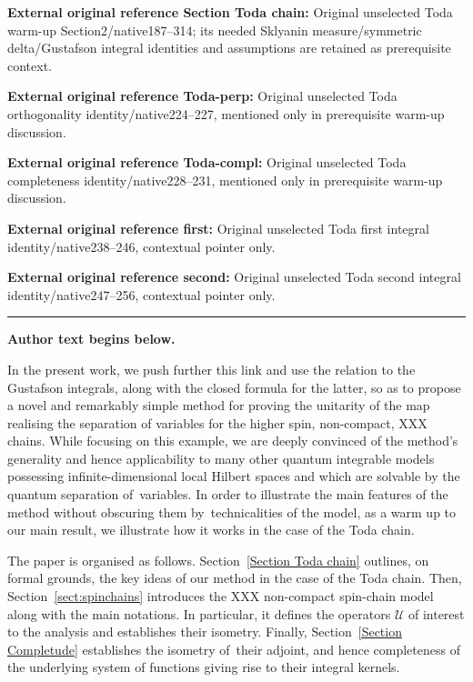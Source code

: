 \documentclass[11pt]{article}
\numberwithin{equation}{section}
\numberwithin{equation}{section}
\begin{document}
\noindent\textbf{External original reference Section Toda chain:} Original unselected Toda warm-up Section2/native187–314; its needed Sklyanin measure/symmetric delta/Gustafson integral identities and assumptions are retained as prerequisite context.\par
\noindent\textbf{External original reference Toda-perp:} Original unselected Toda orthogonality identity/native224–227, mentioned only in prerequisite warm-up discussion.\par
\noindent\textbf{External original reference Toda-compl:} Original unselected Toda completeness identity/native228–231, mentioned only in prerequisite warm-up discussion.\par
\noindent\textbf{External original reference first:} Original unselected Toda first integral identity/native238–246, contextual pointer only.\par
\noindent\textbf{External original reference second:} Original unselected Toda second integral identity/native247–256, contextual pointer only.\par
\medskip\hrule\medskip\noindent\textbf{Author text begins below.}\par
\setcounter{section}{1}
In the present work, we push further this link and use the relation to the Gustafson integrals, along with the closed formula for the
latter, so as to propose a novel and remarkably simple method for proving the unitarity of the map realising the separation of variables
for the higher spin, non-compact, XXX chains. While focusing on this example, we are deeply convinced of the method's generality and hence
applicability to many other quantum integrable models possessing infinite-dimensional local Hilbert spaces and which are solvable by the
quantum separation of~variables. In order to illustrate the main features of the method without obscuring them by~technicalities of the
model, as a warm up to our main result, we illustrate how it works in the case of the Toda chain.


The paper is organised as follows. Section~\ref{Section Toda chain} outlines, on formal grounds, the key ideas of our method in the case of
the Toda chain. Then, Section~\ref{sect:spinchains} introduces the XXX non-compact spin-chain model along with the main notations. In
particular, it defines the operators $\mathcal{U}$ of interest to the analysis and establishes their isometry. Finally, Section~\ref{Section Completude} establishes the isometry of~their adjoint, and hence completeness of the underlying system of functions giving
rise to their integral kernels.
\end{document}
